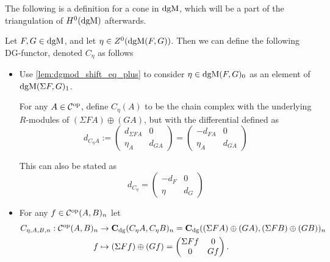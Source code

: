 The following is a definition for a cone in \( \operatorname{dgM} \), which will be a part of the triangulation of \( H^0(\operatorname{dgM}) \) afterwards.

\begin{definition}
    \label{def:dgm_cone}
    Let \( F, G \in \operatorname{dgM} \), and let \( \eta \in Z^0(\operatorname{dgM}(F, G)) \). Then we can define the following DG-functor, denoted \( C_{\eta} \) as follows
    \begin{itemize}
        \item {
            Use \autoref{lem:dgmod_shift_eq_plus} to consider \( \eta \in \operatorname{dgM}(F, G)_0 \) as an element of \( \operatorname{dgM}(\Sigma F, G)_1 \).

            For any \( A \in {\mathcal{C}}^{\operatorname{op}} \), define \( C_{\eta}(A) \) to be the chain complex with the underlying \( R \)-modules of \( (\Sigma F A) \oplus (G A) \), but with the differential defined as
            \[
                d_{C_{\eta}A} :=
                \begin{pmatrix}
                    d_{\Sigma F A} & 0 \\
                    \eta_A & d_{GA}
                \end{pmatrix}
                =
                \begin{pmatrix}
                    -d_{F A} & 0 \\
                    \eta_A & d_{GA}
                \end{pmatrix}
            \]

            This can also be stated as
            \[
                d_{C_{\eta}} =
                \begin{pmatrix}
                    -d_F & 0 \\
                    \eta & d_G
                \end{pmatrix}
            \]
        }
        \item {
            For any \( f \in {\mathcal{C}}^{\operatorname{op}}(A, B)_n \) let
            \begin{align*}
                C_{\eta, A, B, n}: {\mathcal{C}}^{\operatorname{op}}(A, B)_n &\to \operatorname{\mathbf{C}}_{\operatorname{dg}}(C_{\eta} A, C_{\eta} B)_n = \operatorname{\mathbf{C}}_{\operatorname{dg}}((\Sigma F A) \oplus (G A), (\Sigma F B) \oplus (G B))_n \\
                f &\mapsto (\Sigma F f) \oplus (G f) =
                \begin{pmatrix}
                    \Sigma F f & 0 \\
                    0 & G f
                \end{pmatrix}.
            \end{align*}
        }
    \end{itemize}
\end{definition}

